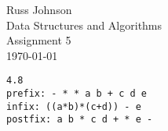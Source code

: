 \documentclass[11pt,a4paper]{article}
\begin{document}
\lstset{language=C++,
basicstyle=\small\ttfamily,
xleftmargin=-2cm,
tabsize=4,
showspaces=false,
showstringspaces=false}

\begin{flushright}
Russ Johnson\\
Data Structures and Algorithms\\
Assignment 5\\
\today\\
\end{flushright}
\begin{verbatim}
4.8 
prefix: - * * a b + c d e
infix: ((a*b)*(c+d)) - e
postfix: a b * c d + * e -
\end{verbatim}
\newpage
\end{document}
